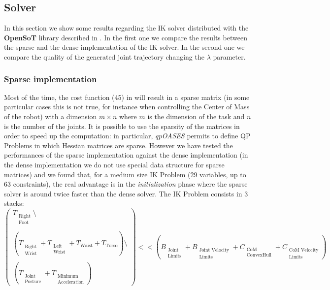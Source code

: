 \subsection{Solver}
In this section we show some results regarding the IK solver distributed with the \textbf{OpenSoT} library described in \cite{rocchimingo:16}. In the first one we compare the results between the sparse and the dense implementation of the IK solver. In the second one we compare the quality of the generated joint trajectory changing the $\lambda$ parameter. 

\subsubsection{Sparse implementation}
Most of the time, the cost function (45) in \cite{rocchimingo:16}
will result in a sparse matrix (in some particular cases this is not true, for instance when controlling the Center of Mass of the robot) with a dimension $m \times n$ where $m$ is the dimension of the task and $n$ is the number of the joints.  
It is possible to use the sparsity of the matrices in order to speed up the computation: in particular, \emph{qpOASES} permits to define QP Problems in which Hessian matrices are sparse. However we have tested the performances of the sparse implementation against the dense implementation (in the dense implementation we do not use special data structure for sparse matrices) and we found that, for a medium size IK Problem (29 variables, up to 63 constraints), the real advantage is in the \emph{initialization} phase where the sparse solver is around twice faster than the dense solver. The IK Problem consists in 3 stacks: 
\begin{equation}
\begin{pmatrix}
T_{\substack{\text{Right}\\\text{Foot}}}\setminus\\
\\
\left(T_{\substack{\text{Right}\\\text{Wrist}}} + T_{\substack{\text{Left}\\\text{Wrist}}} + T_\text{Waist} + T_\text{Torso}\right)\setminus\\ 
\\
\left(T_{\substack{\text{Joint}\\\text{Posture}}} + T_{\substack{\text{Minimum}\\\text{Acceleration}}}\right)
\end{pmatrix}
<< \left(B_{\substack{\text{Joint}\\\text{Limits}}} + B_{\substack{\text{Joint Velocity}\\\text{Limits}}} + C_{\substack{\text{CoM}\\\text{ConvexHull}}} 
+ C_{\substack{\text{CoM Velocity}\\\text{Limits}}}\right)
\end{equation}

